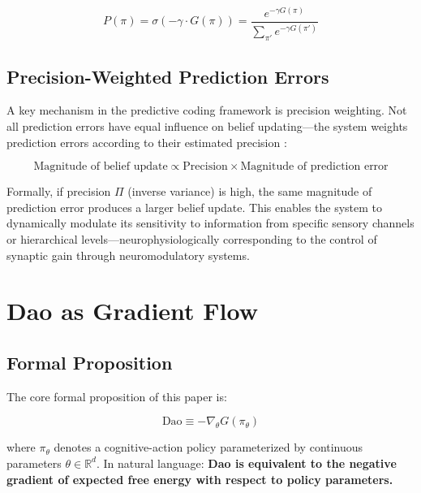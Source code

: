 \documentclass[11pt,a4paper]{article}
\begin{document}
\begin{equation}
P(\pi) = \sigma(-\gamma \cdot G(\pi)) = \frac{e^{-\gamma G(\pi)}}{\sum_{\pi'} e^{-\gamma G(\pi')}}
\label{eq:policy}
\end{equation}

\subsection{Precision-Weighted Prediction Errors}

A key mechanism in the predictive coding framework is precision weighting. Not all prediction errors have equal influence on belief updating---the system weights prediction errors according to their estimated precision \cite{Feldman2010}:

\begin{equation}
\text{Magnitude of belief update} \propto \text{Precision} \times \text{Magnitude of prediction error}
\end{equation}

Formally, if precision $\Pi$ (inverse variance) is high, the same magnitude of prediction error produces a larger belief update. This enables the system to dynamically modulate its sensitivity to information from specific sensory channels or hierarchical levels---neurophysiologically corresponding to the control of synaptic gain through neuromodulatory systems.

\section{Dao as Gradient Flow}

\subsection{Formal Proposition}

The core formal proposition of this paper is:

\begin{equation}
\boxed{\text{Dao} \equiv -\nabla_\theta G(\pi_\theta)}
\label{eq:dao_gradient}
\end{equation}

where $\pi_\theta$ denotes a cognitive-action policy parameterized by continuous parameters $\theta \in \mathbb{R}^d$. In natural language: \textbf{Dao is equivalent to the negative gradient of expected free energy with respect to policy parameters.}
\end{document}
